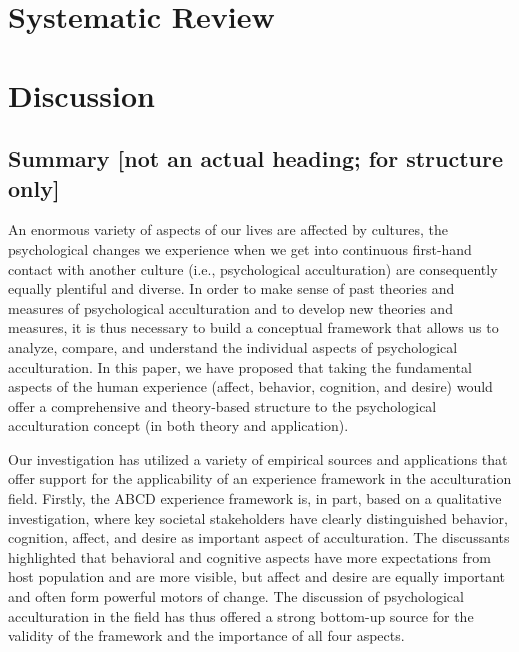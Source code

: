 \documentclass[man, 12pt, a4paper]{apa7}
\begin{document}
\section{Systematic Review}


\section{Discussion}

\subsection{Summary [not an actual heading; for structure only]}
An enormous variety of aspects of our lives are affected by cultures, the psychological changes we experience when we get into continuous first-hand contact with another culture (i.e., psychological acculturation) are consequently equally plentiful and diverse.
In order to make sense of past theories and measures of psychological acculturation and to develop new theories and measures, it is thus necessary to build a conceptual framework that allows us to analyze, compare, and understand the individual aspects of psychological acculturation.
In this paper, we have proposed that taking the fundamental aspects of the human experience (affect, behavior, cognition, and desire) would offer a comprehensive and theory-based structure to the psychological acculturation concept (in both theory and application).

Our investigation has utilized a variety of empirical sources and applications that offer support for the applicability of an experience framework in the acculturation field. Firstly, the ABCD experience framework is, in part, based on a qualitative investigation, where key societal stakeholders have clearly distinguished behavior, cognition, affect, and desire as important aspect of acculturation. The discussants highlighted that behavioral and cognitive aspects have more expectations from host population and are more visible, but affect and desire are equally important and often form powerful motors of change. The discussion of psychological acculturation in the field has thus offered a strong bottom-up source for the validity of the framework and the importance of all four aspects.
\end{document}
